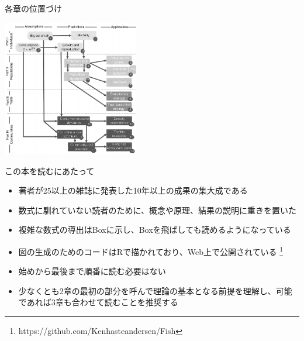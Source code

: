 \documentclass[
  ignorenonframetext,
]{beamer}
\providecommand{\tightlist}{%
  \setlength{\itemsep}{0pt}\setlength{\parskip}{0pt}}
\newcommand{\vspacesmall}{\vspace{3mm}}
\begin{document}
\begin{frame}{各章の位置づけ}
\protect\hypertarget{ux5404ux7ae0ux306eux4f4dux7f6eux3065ux3051}{}

\begin{center}\includegraphics[width=225px]{Fig2} \end{center}

\end{frame}

\begin{frame}{この本を読むにあたって}
\protect\hypertarget{ux3053ux306eux672cux3092ux8aadux3080ux306bux3042ux305fux3063ux3066}{}

\begin{itemize}
\tightlist
\item
  著者が25以上の雑誌に発表した10年以上の成果の集大成である\\
  \vspacesmall
\item
  数式に馴れていない読者のために、概念や原理、結果の説明に重きを置いた\\
  \vspacesmall
\item
  複雑な数式の導出はBoxに示し、Boxを飛ばしても読めるようになっている\\
  \vspacesmall
\item
  図の生成のためのコードはRで描かれており、Web上で公開されている
  \footnote[frame]{https://github.com/Kenhasteandersen/Fish}\\
  \vspacesmall
\item
  始めから最後まで順番に読む必要はない\\
  \vspacesmall
\item
  少なくとも2章の最初の部分を呼んで理論の基本となる前提を理解し、可能であれば3章も合わせて読むことを推奨する
\end{itemize}

\end{frame}
\end{document}
